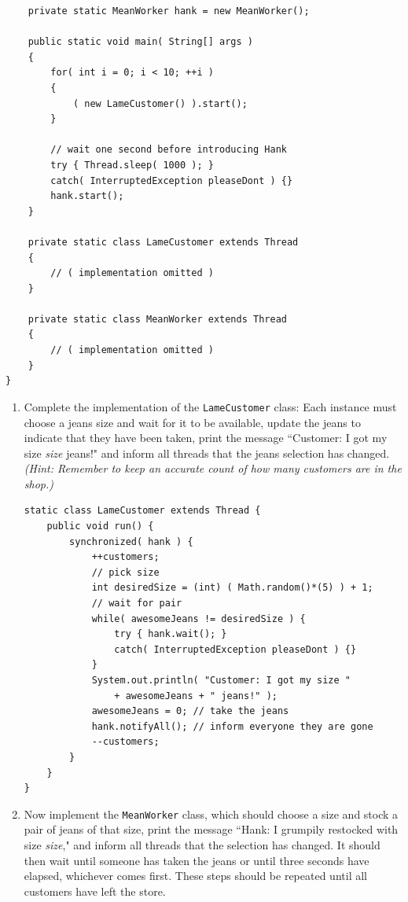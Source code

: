 \documentclass[11pt]{article}
\newenvironment{answer}{\large\lstset{basicstyle=\tiny\ttfamily}\color{white}}{}
\newenvironment{answer}{\large\lstset{basicstyle=\large\ttfamily}\color{red}}{}
\begin{document}
\begin{enumerate}
\begin{lstlisting}
    private static MeanWorker hank = new MeanWorker();
    
    public static void main( String[] args )
    {
        for( int i = 0; i < 10; ++i )
        {
            ( new LameCustomer() ).start();
        }

		// wait one second before introducing Hank
        try { Thread.sleep( 1000 ); }
        catch( InterruptedException pleaseDont ) {}
        hank.start();
    }
    
    private static class LameCustomer extends Thread
    {
        // ( implementation omitted )
    }
    
    private static class MeanWorker extends Thread
    {
        // ( implementation omitted )
    }
}
\end{lstlisting}

    \begin{enumerate}

	\pagebreak

    \item Complete the implementation of the \texttt{LameCustomer} class: Each instance
          must choose a jeans size and wait for it to be available, update the
          jeans to indicate that they have been taken, print the message
          ``Customer: I got my size \emph{size} jeans!" and inform all threads
          that the jeans selection has changed. \\
		  \textit{(Hint: Remember to keep an
          accurate count of how many customers are in the shop.)}

\begin{answer}
\begin{lstlisting}
static class LameCustomer extends Thread {
    public void run() {
        synchronized( hank ) {
            ++customers;
			// pick size
            int desiredSize = (int) ( Math.random()*(5) ) + 1;
			// wait for pair
            while( awesomeJeans != desiredSize ) {
                try { hank.wait(); }
                catch( InterruptedException pleaseDont ) {}
            }
            System.out.println( "Customer: I got my size "
                + awesomeJeans + " jeans!" );
            awesomeJeans = 0; // take the jeans
            hank.notifyAll(); // inform everyone they are gone
            --customers;
        }
    }
}
\end{lstlisting}
\end{answer}

    \item Now implement the \texttt{MeanWorker} class, which should choose a size and
          stock a pair of jeans of that size, print the message ``Hank: I
          grumpily restocked with size \emph{size}," and inform all threads
          that the selection has changed. It should then wait until someone has
          taken the jeans or until three seconds have elapsed, whichever comes
          first. These steps should be repeated until all customers have left
          the store.


\end{enumerate}
\end{enumerate}
\end{document}
